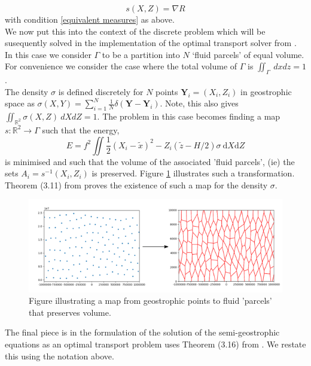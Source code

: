 \begin{equation}
	s(X,Z) = \nabla R
\end{equation}
with condition \ref{equivalent measures} as above.
\\
\linebreak
We now put this into the context of the discrete problem which will be susequently solved in the implementation of the optimal transport solver from \cite{Merigot2017}.
In this case we consider $\Gamma$ to be a partition into $N$ {\textquoteleft fluid parcels\textquoteright} of equal volume. For convenience we consider the case where the total volume of $\Gamma$ is $\iint_{\Gamma} \ dxdz = 1$.
\\
\linebreak
The density $\sigma$ is defined discretely for $N$ points $\bm{Y}_i = \left(X_i,Z_i\right)$ in geostrophic space as $\sigma(X,Y) = \sum_{i=1}^{N}\frac{1}{N}\delta\left(\bm{Y}-\bm{Y}_i\right)$. Note, this also gives $	\iint_{\mathbb{R}^2} \sigma\left(X,Z\right) \ dXdZ = 1$. The problem in this case becomes finding a map $s: \mathbb{R}^2 \rightarrow \Gamma$ such that the energy,
\begin{equation}
E = f^2 \iint \frac{1}{2}\left(X_i-\tilde{x}\right)^2 - Z_i\left(\tilde{z} - H/2\right)\sigma \ \textrm{d}X\textrm{d}Z
\end{equation}
is minimised and such that the volume of the associated 'fluid parcels', (ie) the sets $A_i = s^{-1}(X_i,Z_i)$ is preserved. Figure \ref{fig:gpointsmapping} illustrates such a transformation. Theorem (3.11) from \cite{Cullen2006a} proves the existence of such a map for the density $\sigma$.
\begin{figure}[h]
	\centering
	\includegraphics[width=\linewidth]{background/gpoints_mapping}
	\caption[Map from geostrophic points to fluid 'parcels']{Figure illustrating a map from geostrophic points to fluid 'parcels' that preserves volume.}
	\label{fig:gpointsmapping}
\end{figure}
The final piece is in the formulation of the solution of the semi-geostrophic equations as an optimal transport problem uses Theorem (3.16) from \cite{Cullen2006a}. We restate this using the notation above.

